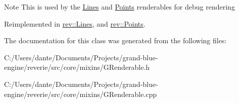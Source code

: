 \begin{DoxyNote}{Note}
This is used by the \mbox{\hyperlink{classrev_1_1_lines}{Lines}} and \mbox{\hyperlink{classrev_1_1_points}{Points}} renderables for debug rendering 
\end{DoxyNote}


Reimplemented in \mbox{\hyperlink{classrev_1_1_lines_a35469d8c869e1a6ca1906bb43cfc4861}{rev\+::\+Lines}}, and \mbox{\hyperlink{classrev_1_1_points_a598b47126cab4485664cb83f07ba2651}{rev\+::\+Points}}.



The documentation for this class was generated from the following files\+:\begin{DoxyCompactItemize}
\item 
C\+:/\+Users/dante/\+Documents/\+Projects/grand-\/blue-\/engine/reverie/src/core/mixins/G\+Renderable.\+h\item 
C\+:/\+Users/dante/\+Documents/\+Projects/grand-\/blue-\/engine/reverie/src/core/mixins/G\+Renderable.\+cpp\end{DoxyCompactItemize}
